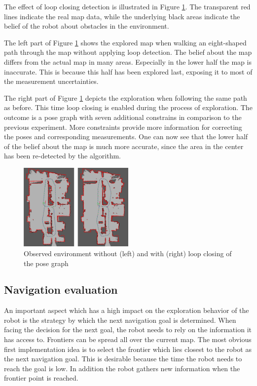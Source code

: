 \documentclass{ba-kecs}
\begin{document}
The effect of loop closing detection is illustrated in Figure \ref{fig:loop_closing_comparison}. The transparent red lines indicate the real map data, while the underlying black areas indicate the belief of the robot about obstacles in the environment.

The left part of Figure \ref{fig:loop_closing_comparison} shows the explored map when walking an eight-shaped path through the map without applying loop detection. The belief about the map differs from the actual map in many areas. Especially in the lower half the map is inaccurate. This is because this half has been explored last, exposing it to most of the measurement uncertainties.

The right part of Figure \ref{fig:loop_closing_comparison} depicts the exploration when following the same path as before. This time loop closing is enabled during the process of exploration. The outcome is a pose graph with seven additional constrains in comparison to the previous experiment. More constraints provide more information for correcting the poses and corresponding measurements. One can now see that the lower half of the belief about the map is much more accurate, since the area in the center has been re-detected by the algorithm.

\begin{figure}[htbp]
	\centering
		\includegraphics[width=0.50\textwidth]{figures/Loop_closing_compared.jpg}
	\caption{Observed environment without (left) and with (right) loop closing of the pose graph}
	\label{fig:loop_closing_comparison}
\end{figure}

\subsection{Navigation evaluation}
\label{sec:navEval}
An important aspect which has a high impact on the exploration behavior of the robot is the strategy by which the next navigation goal is determined. When facing the decision for the next goal, the robot needs to rely on the information it has access to. Frontiers can be spread all over the current map. The most obvious first implementation idea is to select the frontier which lies closest to the robot as the next navigation goal. This is desirable because the time the robot needs to reach the goal is low. In addition the robot gathers new information when the frontier point is reached.
\end{document}
